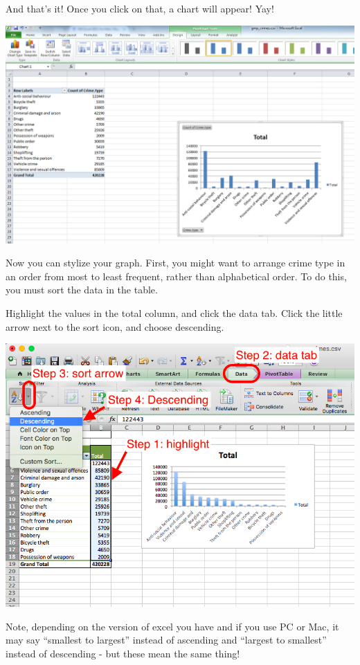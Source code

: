 \documentclass[
]{book}
\begin{document}
And that's it! Once you click on that, a chart will appear! Yay!

\includegraphics{imgs/chart_appears.png}

Now you can stylize your graph. First, you might want to arrange crime type in an order from most to least frequent, rather than alphabetical order. To do this, you must sort the data in the table.

Highlight the values in the total column, and click the data tab. Click the little arrow next to the sort icon, and choose descending.

\includegraphics{imgs/sort_graph.png}

Note, depending on the version of excel you have and if you use PC or Mac, it may say ``smallest to largest'' instead of ascending and ``largest to smallest'' instead of descending - but these mean the same thing!
\end{document}
